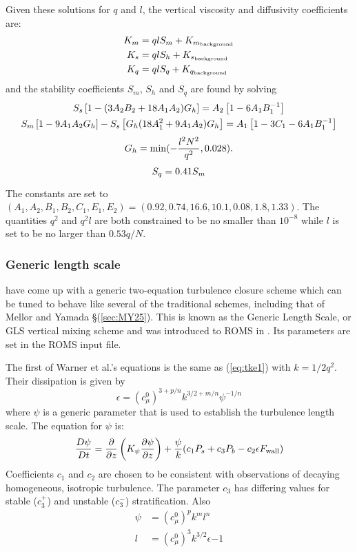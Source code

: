 Given these solutions for $q$ and $l$, the vertical viscosity and
diffusivity coefficients are:
\begin{align}
  K_m &= qlS_m + K_{m_{\rm background}} \\
  K_s &= qlS_h + K_{s_{\rm background}} \\
  K_q &= qlS_q + K_{q_{\rm background}}
\end{align}
and the stability coefficients $S_m$, $S_h$ and $S_q$ are found by
solving
\begin{gather}
  S_s \left[ 1 - (3A_2 B_2 + 18 A_1 A_2) G_h \right] =
  A_2 \left[ 1 - 6A_1 B_1^{-1} \right]
\\ \vspace{1mm}
  S_m \left[ 1 - 9A_1 A_2 G_h \right] - S_s \left[ G_h ( 18 A_1^2 +
  9A_1 A_2 ) G_h \right] =
  A_1 \left[ 1 - 3C_1 - 6A_1 B_1^{-1} \right]
\\ \vspace{1mm}
  G_h = \min ( -{l^2N^2 \over q^2}, 0.028 ).
\\ \vspace{1mm}
  S_q = 0.41 S_m
\end{gather}
The constants are set to $(A_1, A_2, B_1, B_2, C_1, E_1, E_2) = 
(0.92, 0.74, 16.6, 10.1, 0.08, 1.8, 1.33)$. The quantities $q^2$ and
$q^2l$ are both constrained to be no smaller than $10^{-8}$ while $l$
is set to be no larger than $0.53q/N$.

\subsubsection{Generic length scale}
\citep{Umlauf2003} have come up with a generic
two-equation turbulence closure scheme which can be tuned to behave
like several of the traditional schemes, including that of Mellor
and Yamada \S(\ref{sec:MY25}). This is known as the Generic Length
Scale, or GLS vertical mixing scheme and was introduced to ROMS in
\citep{Warner_2005}. Its parameters are set in the
ROMS input file.

The first of Warner et al.'s equations is the same as (\ref{eq:tke1})
with $k=1/2 q^2$. Their dissipation is given by
\begin{equation}
  \epsilon = (c^0_\mu ) ^{3+p/n} k^{3/2+m/n} \psi ^{-1/n}
\end{equation}
where $\psi$ is a generic parameter that is used to establish the
turbulence length scale. The equation for $\psi$ is:
\begin{equation}
  {D \psi \over D t} = {\partial \over \partial z} \left( K_\psi  
  {\partial \psi \over \partial z}\right) + {\psi \over k}
  (c_1 P_s + c_3 P_b - c_2 \epsilon F_{\rm wall})
\end{equation}
Coefficients $c_1$ and $c_2$ are chosen to be consistent
with observations of decaying homogeneous, isotropic turbulence. The
parameter $c_3$ has differing values for stable ($c^+_3$) and unstable
($c^-_3$) stratification. Also
\begin{eqnarray}
   \psi &= (c^0_\mu)^p k^m l^n \\
   l &= (c^0_\mu)^3 k^{3/2} \epsilon{-1}
\end{eqnarray}


